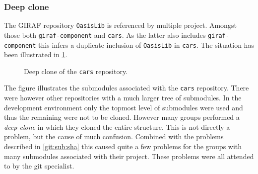 \subsubsection{Deep clone}\label{git:sub:deep}
The GIRAF repository \texttt{OasisLib} is referenced by multiple project.
Amongst those both \texttt{giraf-component} and \texttt{cars}.
As the latter also includes \texttt{giraf-component} this infers a duplicate inclusion of \texttt{OasisLib} in \texttt{cars}.
The situation has been illustrated in \cref{git:sub:clonefig}.
\begin{figure}[h]
\centering
{}
\caption{Deep clone of the \texttt{cars} repository.}
\label{git:sub:clonefig}
\end{figure}
The figure illustrates the submodules associated with the \texttt{cars} repository.
There were however other repositories with a much larger tree of submodules.
In the development environment only the topmost level of submodules were used and thus the remaining were not to be cloned.
However many groups performed a \textit{deep clone} in which they cloned the entire structure.
This is not directly a problem, but the cause of much confusion.
Combined with the problems described in \cref{git:sub:sha} this caused quite a few problems for the groups with many submodules associated with their project.
These problems were all attended to by the git specialist.

